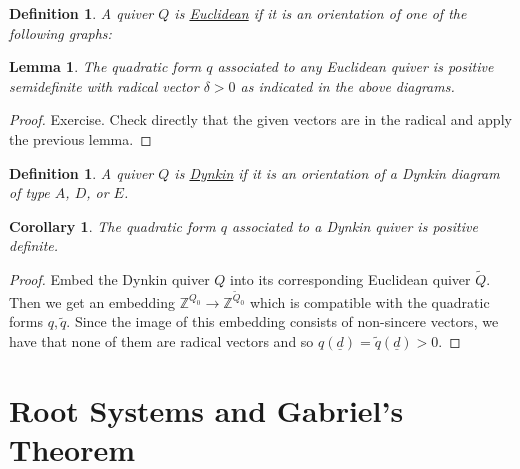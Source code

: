 \documentclass{book}
\newtheorem{lemma}[theorem]{Lemma}
\newtheorem{corollary}[theorem]{Corollary}
\newtheorem{definition}[theorem]{Definition}
\begin{document}
\begin{definition}
A quiver $Q$ is \underline{Euclidean} if it is an orientation of one of the following graphs:
\end{definition}

\begin{lemma}
The quadratic form $q$ associated to any Euclidean quiver is positive semidefinite with radical vector $\delta>0$ as indicated in the above diagrams.
\end{lemma}

\begin{proof}
Exercise. Check directly that the given vectors are in the radical and apply the previous lemma.
\end{proof}

\begin{definition}
A quiver $Q$ is \underline{Dynkin} if it is an orientation of a Dynkin diagram of type $A$, $D$, or $E$.
\end{definition}

\begin{corollary}
The quadratic form $q$ associated to a Dynkin quiver is positive definite.
\end{corollary}

\begin{proof}
Embed the Dynkin quiver $Q$ into its corresponding Euclidean quiver $\tilde{Q}$. Then we get an embedding $\mathbb{Z}^{Q_0}\to \mathbb{Z}^{\tilde{Q}_0}$ which is compatible with the quadratic forms $q, \tilde{q}$. Since the image of this embedding consists of non-sincere vectors, we have that none of them are radical vectors and so $q(\underline{d})=\tilde{q}(\underline{d})>0$.
\end{proof}



  \section{Root Systems and Gabriel's Theorem}
  
\end{document}
